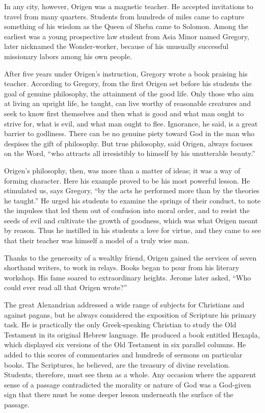 In any city, however, Origen was a magnetic teacher. He accepted invitations to travel from many
quarters. Students from hundreds of miles came to capture something of his wisdom as the Queen of
Sheba came to Solomon. Among the earliest was a young prospective law student from Asia Minor named
Gregory, later nicknamed the Wonder-worker, because of his unusually successful missionary labors
among his own people.

After five years under Origen’s instruction, Gregory wrote a book praising his teacher. According to
Gregory, from the first Origen set before his students the goal of genuine philosophy, the
attainment of the good life. Only those who aim at living an upright life, he taught, can live
worthy of reasonable creatures and seek to know first themselves and then what is good and what man
ought to strive for, what is evil, and what man ought to flee. Ignorance, he said, is a great
barrier to godliness. There can be no genuine piety toward God in the man who despises the gift of
philosophy. But true philosophy, said Origen, always focuses on the Word, “who attracts all
irresistibly to himself by his unutterable beauty.”

Origen’s philosophy, then, was more than a matter of ideas; it was a way of forming character. Here
his example proved to be his most powerful lesson. He stimulated us, says Gregory, “by the acts he
performed more than by the theories he taught.” He urged his students to examine the springs of
their conduct, to note the impulses that led them out of confusion into moral order, and to resist
the seeds of evil and cultivate the growth of goodness, which was what Origen meant by reason. Thus
he instilled in his students a love for virtue, and they came to see that their teacher was himself
a model of a truly wise man.

Thanks to the generosity of a wealthy friend, Origen gained the services of seven shorthand writers,
to work in relays. Books began to pour from his literary workshop. His fame soared to extraordinary
heights. Jerome later asked, “Who could ever read all that Origen wrote?”

The great Alexandrian addressed a wide range of subjects for Christians and against pagans, but he
always considered the exposition of Scripture his primary task. He is practically the only
Greek-speaking Christian to study the Old Testament in its original Hebrew language. He produced a
book entitled Hexapla, which displayed six versions of the Old Testament in six parallel columns. He
added to this scores of commentaries and hundreds of sermons on particular books. The Scriptures, he
believed, are the treasury of divine revelation. Students, therefore, must see them as a whole. Any
occasion where the apparent sense of a passage contradicted the morality or nature of God was a
God-given sign that there must be some deeper lesson underneath the surface of the passage.

